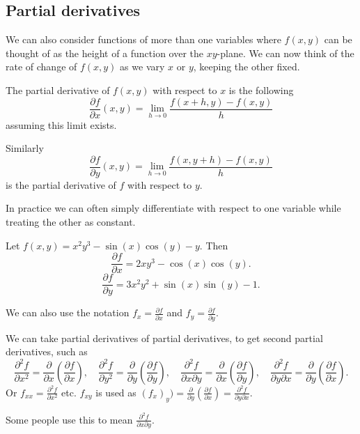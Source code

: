 \documentclass[10pt, a4paper]{article}
\begin{document}
\subsection{Partial derivatives}
We can also consider functions of more than one variables
where $f(x, y)$ can be thought of as the height of a function over the $xy$-plane.
We can now think of the rate of change of $f(x, y)$ as we vary $x$ or $y$,
keeping the other fixed.

\begin{definition}
    The partial derivative of $f(x, y)$ with respect to $x$ is the following
    \[
    \frac{\partial f}{\partial x}(x, y) = \lim_{h \rightarrow 0}\frac{f(x + h, y) - f(x, y)}{h}
    \]
    assuming this limit exists.

    Similarly
    \[
    \frac{\partial f}{\partial y}(x, y) = \lim_{h \rightarrow 0}\frac{f(x, y + h) - f(x, y)}{h}
    \]
    is the partial derivative of $f$ with respect to $y$.
\end{definition}

In practice we can often simply differentiate with respect to one variable while treating the other as constant.

\begin{example}
    Let $f(x, y) = x ^ 2 y ^ 3 - \sin(x)\cos(y) - y$.
    Then
    \[
    \frac{\partial f}{\partial x} = 2xy ^ 3 - \cos(x)\cos(y).
    \]
    \[
    \frac{\partial f}{\partial y} = 3x ^ 2y ^ 2 + \sin(x)\sin(y) - 1.
    \]
\end{example}

We can also use the notation $f_x = \frac{\partial f}{\partial x}$ and $f_y = \frac{\partial f}{\partial y}$.

We can take partial derivatives of partial derivatives,
to get second partial derivatives, such as
\[
\frac{\partial ^ 2 f}{\partial x ^ 2} = \frac{\partial}{\partial x}\left(\frac{\partial f}{\partial x}\right),
\quad
\frac{\partial ^ 2 f}{\partial y ^ 2} = \frac{\partial}{\partial y}\left(\frac{\partial f}{\partial y}\right),
\quad
\frac{\partial ^ 2 f}{\partial x \partial y} = \frac{\partial}{\partial x}\left(\frac{\partial f}{\partial y}\right),
\quad
\frac{\partial ^ 2 f}{\partial y \partial x} = \frac{\partial}{\partial y}\left(\frac{\partial f}{\partial x}\right).
\]
Or $f_{xx} = \frac{\partial ^ 2 f}{\partial x ^ 2}$ etc.
$f_{xy}$ is used as $(f_x)_y) = \frac{\partial}{\partial y}\left(\frac{\partial f}{\partial x}\right) = \frac{\partial ^ 2 f}{\partial y \partial x}$.

Some people use this to mean $\frac{\partial ^ 2 f}{\partial x \partial y}$.
\end{document}
